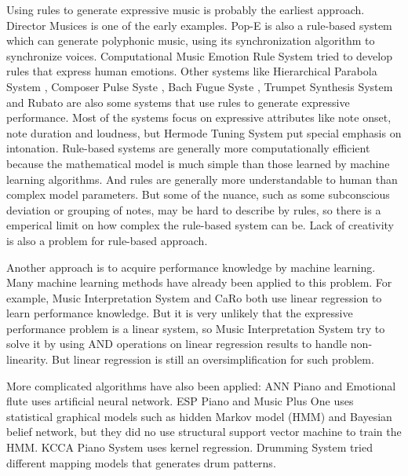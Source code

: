 Using rules to generate expressive music is probably the earliest approach. Director Musices \cite{17} is one of the early examples.  Pop-E \cite{28} is also a rule-based system which can generate polyphonic music, using its synchronization algorithm to synchronize voices. Computational Music Emotion Rule System \cite{31} tried to develop rules that express human emotions. Other systems like Hierarchical Parabola System \cite{17}\cite{18}\cite{19}\cite{20}, Composer Pulse Syste \cite{21,22}, Bach Fugue Syste \cite{23}, Trumpet Synthesis System \cite{24, 25} and Rubato \cite{26, 27} are also some systems that use rules to generate expressive performance. Most of the systems focus on expressive attributes like note onset, note duration and loudness, but Hermode Tuning System \cite{29} put special emphasis on intonation. Rule-based systems are generally more computationally efficient because the mathematical model is much simple than those learned by machine learning algorithms. And rules are generally more understandable to human than complex model parameters. But some of the nuance, such as some subconscious deviation or grouping of notes, may be hard to describe by rules, so there is a emperical limit on how complex the rule-based system can be. Lack of creativity is also a problem for rule-based approach.

Another approach is to acquire performance knowledge by machine learning. Many machine learning methods have already been applied to this problem. For example, Music Interpretation System \cite{32,33,34} and CaRo \cite{35,36,37} both use linear regression to learn performance knowledge. But it is very unlikely that the expressive performance problem is a linear system, so Music Interpretation System try to solve it by using AND operations on linear regression results to handle non-linearity. But linear regression is still an oversimplification for such problem.

More complicated algorithms have also been applied: ANN Piano \cite{38} and Emotional flute \cite{39} uses artificial neural network. ESP Piano \cite{55} and Music Plus One \cite{52,53,54} uses statistical graphical models such as hidden Markov model (HMM) and Bayesian belief network, but they did no use structural support vector machine to train the HMM.%
KCCA Piano System \cite{57} uses kernel regression. Drumming System \cite{82} tried different mapping models that generates drum patterns.

